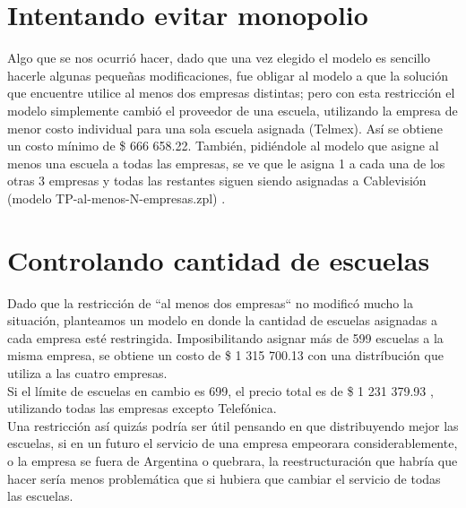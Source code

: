 \documentclass{article}
\begin{document}
\section{Intentando evitar monopolio}
Algo que se nos ocurrió hacer, dado que una vez elegido el modelo es sencillo hacerle algunas pequeñas modificaciones, fue obligar al modelo a que la solución que encuentre utilice al menos dos empresas distintas; pero con esta restricción el modelo simplemente cambió el proveedor de una escuela, utilizando la empresa de menor costo individual para una sola escuela asignada (Telmex). Así se obtiene un costo mínimo de \$ 666 658.22. También, pidiéndole al modelo que asigne al menos una escuela a todas las empresas, se ve que le asigna 1 a cada una de los otras 3 empresas y todas las restantes siguen siendo asignadas a Cablevisión (modelo TP-al-menos-N-empresas.zpl) .

\section{Controlando cantidad de escuelas}
Dado que la restricción de ``al menos dos empresas`` no modificó mucho la situación, planteamos un modelo en donde la cantidad de escuelas asignadas a cada empresa esté restringida. Imposibilitando asignar más de 599 escuelas a la misma empresa, se obtiene un costo de \$ 1 315 700.13 con una distríbución que utiliza a las cuatro empresas.\\
Si el límite de escuelas en cambio es 699, el precio total es de \$ 1 231 379.93 , utilizando todas las empresas excepto Telefónica.\\
Una restricción así quizás podría ser útil pensando en que distribuyendo mejor las escuelas, si en un futuro el servicio de una empresa empeorara considerablemente, o la empresa se fuera de Argentina o quebrara, la reestructuración que habría que hacer sería menos problemática que si hubiera que cambiar el servicio de todas las escuelas.
\end{document}

